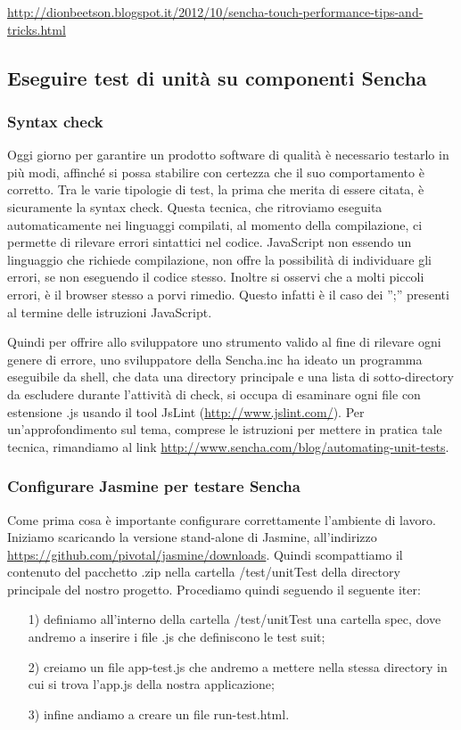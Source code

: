 \documentclass[10pt,a4paper,onecolumn]{article}
\begin{document}
\url{http://dionbeetson.blogspot.it/2012/10/sencha-touch-performance-tips-and-tricks.html}

\subsection{Eseguire test di unità su componenti Sencha}

\subsubsection{Syntax check}

Oggi giorno per garantire un prodotto software di qualità è necessario testarlo in più modi, affinché si possa stabilire con certezza che il suo comportamento è corretto. Tra le varie tipologie di test, la prima che merita di essere citata, è sicuramente la syntax check. Questa tecnica, che ritroviamo eseguita automaticamente nei linguaggi compilati, al momento della compilazione, ci permette di rilevare errori sintattici nel codice. JavaScript non essendo un linguaggio che richiede compilazione, non offre la possibilità di individuare gli errori, se non eseguendo il codice stesso. Inoltre si osservi che a molti piccoli errori, è il browser stesso a porvi rimedio. Questo infatti è il caso dei '';'' presenti al termine delle istruzioni JavaScript. 

Quindi per offrire allo sviluppatore uno strumento valido al fine di rilevare ogni genere di errore, uno sviluppatore della Sencha.inc ha ideato un programma eseguibile da shell, che data una directory principale e una lista di sotto-directory da escludere durante l'attività di check, si occupa di esaminare ogni file con estensione .js usando il tool JsLint (\url{http://www.jslint.com/}). Per un'approfondimento sul tema, comprese le istruzioni per mettere in pratica tale tecnica, rimandiamo al link \url{http://www.sencha.com/blog/automating-unit-tests}.

\subsubsection{Configurare Jasmine per testare Sencha}

Come prima cosa è importante configurare correttamente l'ambiente di lavoro. Iniziamo scaricando la versione stand-alone di Jasmine, all'indirizzo \url{https://github.com/pivotal/jasmine/downloads}. Quindi scompattiamo il contenuto del pacchetto .zip nella cartella /test/unitTest della directory principale del nostro progetto. Procediamo quindi seguendo il seguente iter:
\begin{itemize}
	\item[1)] definiamo all'interno della cartella /test/unitTest una cartella spec, dove andremo a inserire i file .js che definiscono le test suit;
	\item[2)] creiamo un file app-test.js che andremo a mettere nella stessa directory in cui si trova l'app.js della nostra applicazione;
	\item[3)] infine andiamo a creare un file run-test.html.
\end{itemize}
\end{document}
